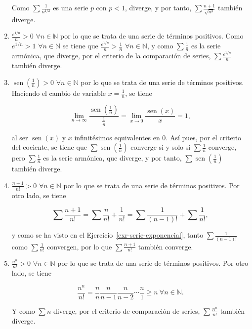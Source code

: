 \documentclass[
  a4paper,
]{scrreport}
\theoremstyle{definition}
\theoremstyle{remark}
\begin{document}
\begin{tcolorbox}
\begin{enumerate}
  Como \(\sum \frac{1}{n^{1/2}}\) es una serie \(p\) con \(p<1\),
  diverge, y por tanto, \(\sum \frac{n+1}{\sqrt{n^3}}\) también diverge.
\item
  \(\frac{e^{1/n}}{n}>0\) \(\forall n\in\mathbb{N}\) por lo que se trata
  de una serie de términos positivos. Como \(e^{1/n}>1\)
  \(\forall n\in\mathbb{N}\) se tiene que
  \(\frac{e^{1/n}}{n}>\frac{1}{n}\) \(\forall n\in\mathbb{N}\), y como
  \(\sum \frac{1}{n}\) es la serie armónica, que diverge, por el
  criterio de la comparación de series, \(\sum \frac{e^{1/n}}{n}\)
  también diverge.
\item
  \(\operatorname{sen}\left(\frac{1}{n}\right)>0\)
  \(\forall n\in\mathbb{N}\) por lo que se trata de una serie de
  términos positivos. Haciendo el cambio de variable \(x=\frac{1}{n}\),
  se tiene

  \[
   \lim_{n\to\infty}\frac{\operatorname{sen}\left(\frac{1}{n}\right)}{\frac{1}{n}} = \lim_{x\to 0}\frac{\operatorname{sen}(x)}{x} = 1,
   \]

  al ser \(\operatorname{sen}(x)\) y \(x\) infinitésimos equivalentes en
  \(0\). Así pues, por el criterio del cociente, se tiene que
  \(\sum \operatorname{sen}\left(\frac{1}{n}\right)\) converge si y solo
  si \(\sum \frac{1}{n}\) converge, pero \(\sum \frac{1}{n}\) es la
  serie armónica, que diverge, y por tanto,
  \(\sum \operatorname{sen}\left(\frac{1}{n}\right)\) también diverge.
\item
  \(\frac{n+1}{n!}>0\) \(\forall n\in\mathbb{N}\) por lo que se trata de
  una serie de términos positivos. Por otro lado, se tiene

  \[
   \sum \frac{n+1}{n!} = \sum \frac{n}{n!}+\frac{1}{n!} = \sum \frac{1}{(n-1)!}+\sum \frac{1}{n!},
   \]

  y como se ha visto en el Ejercicio~\ref{exr-serie-exponencial}, tanto
  \(\sum \frac{1}{(n-1)!}\) como \(\sum \frac{1}{n!}\) convergen, por lo
  que \(\sum \frac{n+1}{n!}\) también converge.
\item
  \(\frac{n^n}{n!}>0\) \(\forall n\in\mathbb{N}\) por lo que se trata de
  una serie de términos positivos. Por otro lado, se tiene

  \[ \frac{n^n}{n!} = \frac{n}{n} \frac{n}{n-1} \frac{n}{n-2} \cdots \frac{n}{1}\geq n \ \forall n\in \mathbb{N}.
   \]

  Y como \(\sum n\) diverge, por el criterio de comparación de series,
  \(\sum \frac{n^n}{n!}\) también diverge.
\end{enumerate}

\end{tcolorbox}
\end{document}
